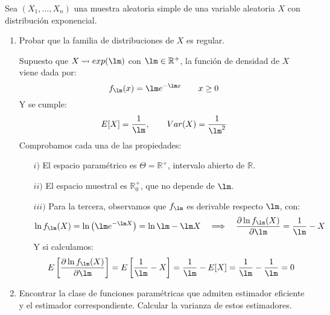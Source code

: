 \begin{ejercicio}\label{ej:9_rel4} 
    Sea $(X_1, \ldots, X_n)$ una muestra aleatoria simple de una variable aleatoria $X$ con distribución exponencial.
    \begin{enumerate}[label=\alph*)]
        \item Probar que la familia de distribuciones de $X$ es regular.

            Supuesto que $X\rightsquigarrow exp(\lm)$ con $\lm\in \mathbb{R}^+$, la función de densidad de $X$ viene dada por:
            \begin{equation*}
                f_\lm(x) = \lm e^{-\lm x} \qquad x\geq 0
            \end{equation*}
            Y se cumple:
            \begin{equation*}
                E[X] = \frac{1}{\lm}, \qquad Var(X) = \frac{1}{\lm^2}
            \end{equation*}
            Comprobamos cada una de las propiedades:
            \begin{enumerate}
                \item[$i)$] El espacio paramétrico es $\Theta=\mathbb{R}^+$, intervalo abierto de $\mathbb{R}$.
                \item[$ii)$] El espacio muestral es $\mathbb{R}^+_0$, que no depende de $\lm$.
                \item[$iii)$] Para la tercera, observamos que $f_\lm$ es derivable respecto $\lm$, con:
                    \begin{equation*}
                        \ln f_\lm(X) = \ln\left(\lm e^{-\lm X}\right) = \ln\lm - \lm X \quad \Longrightarrow \quad  \dfrac{\partial \ln f_\lm(X)}{\partial \lm} = \frac{1}{\lm} - X
                    \end{equation*}
                    Y si calculamos:
                    \begin{equation*}
                        E\left[\dfrac{\partial \ln f_\lm(X)}{\partial \lm}\right] = E\left[\frac{1}{\lm}-X\right] = \frac{1}{\lm}-E[X] = \frac{1}{\lm}-\frac{1}{\lm} = 0
                    \end{equation*}
            \end{enumerate}
        \item Encontrar la clase de funciones paramétricas que admiten estimador eficiente y el estimador correspondiente. Calcular la varianza de estos estimadores.


\end{enumerate}
\end{ejercicio}
